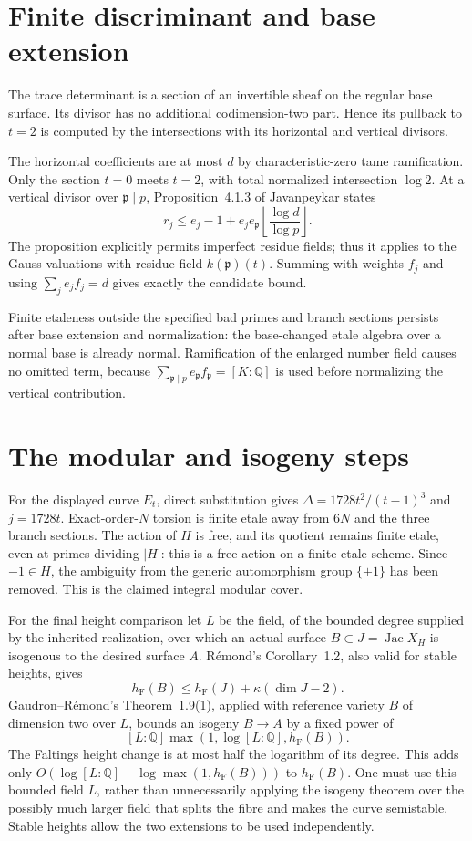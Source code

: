 \documentclass[11pt]{article}
\newcommand{\Q}{\mathbb Q}
\newcommand{\hF}{h_{\mathrm F}}
\begin{document}
\section{Finite discriminant and base extension}
The trace determinant is a section of an invertible sheaf on the
regular base surface. Its divisor has no additional codimension-two
part. Hence its pullback to $t=2$ is computed by the intersections
with its horizontal and vertical divisors.

The horizontal coefficients are at most $d$ by characteristic-zero
tame ramification. Only the section $t=0$ meets $t=2$, with total
normalized intersection $\log2$. At a vertical divisor over
$\mathfrak p\mid p$, Proposition~4.1.3 of Javanpeykar states
\[
 r_j\le e_j-1+e_je_{\mathfrak p}
             \left\lfloor\frac{\log d}{\log p}\right\rfloor.
\]
The proposition explicitly permits imperfect residue fields; thus
it applies to the Gauss valuations with residue field
$k(\mathfrak p)(t)$. Summing with weights $f_j$ and using
$\sum_j e_jf_j=d$ gives exactly the candidate bound.

Finite etaleness outside the specified bad primes and branch
sections persists after base extension and normalization: the
base-changed etale algebra over a normal base is already normal.
Ramification of the enlarged number field causes no omitted term,
because $\sum_{\mathfrak p\mid p}e_{\mathfrak p}f_{\mathfrak p}
=[K:\Q]$ is used before normalizing the vertical contribution.

\section{The modular and isogeny steps}
For the displayed curve $E_t$, direct substitution gives
$\Delta=1728t^2/(t-1)^3$ and $j=1728t$. Exact-order-$N$ torsion
is finite etale away from $6N$ and the three branch sections.
The action of $H$ is free, and its quotient remains finite etale,
even at primes dividing $|H|$: this is a free action on a finite
etale scheme. Since $-1\in H$, the ambiguity from the generic
automorphism group $\{\pm1\}$ has been removed. This is the
claimed integral modular cover.

For the final height comparison let $L$ be the field, of the
bounded degree supplied by the inherited realization, over which
an actual surface $B\subset J=\operatorname{Jac}X_H$ is isogenous
to the desired surface $A$. R\'emond's Corollary~1.2, also valid
for stable heights, gives
\[
 \hF(B)\le\hF(J)+\kappa(\dim J-2).
\]
Gaudron--R\'emond's Theorem~1.9(1), applied with reference variety
$B$ of dimension two over $L$, bounds an isogeny $B\to A$ by a
fixed power of
\[
 [L:\Q]\max(1,\log[L:\Q],\hF(B)).
\]
The Faltings height change is at most half the logarithm of its
degree. This adds only
$O(\log[L:\Q]+\log\max(1,\hF(B)))$ to $\hF(B)$.
One must use this bounded field $L$, rather than unnecessarily
applying the isogeny theorem over the possibly much larger field
that splits the fibre and makes the curve semistable. Stable
heights allow the two extensions to be used independently.
\end{document}
